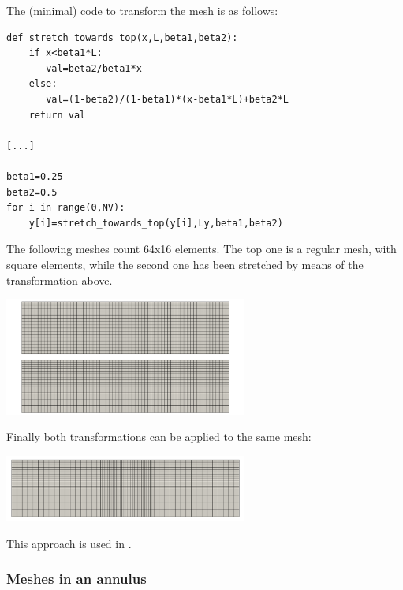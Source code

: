 The (minimal) code to transform the mesh is as follows:
\begin{lstlisting}
def stretch_towards_top(x,L,beta1,beta2):
    if x<beta1*L: 
       val=beta2/beta1*x
    else:
       val=(1-beta2)/(1-beta1)*(x-beta1*L)+beta2*L
    return val

[...]

beta1=0.25
beta2=0.5
for i in range(0,NV):
    y[i]=stretch_towards_top(y[i],Ly,beta1,beta2)
\end{lstlisting}


The following meshes count 64x16 elements. The top one is a regular mesh, with square elements, 
while the second one has been stretched by means of the transformation above.
\begin{center}
\includegraphics[width=8cm]{images/meshes/stretching/stretch_y}
\end{center}

Finally both transformations can be applied to the same mesh:
\begin{center}
\includegraphics[width=8cm]{images/meshes/stretching/stretch_xy}
\end{center}

This approach is used in .

\subsubsection{Meshes in an annulus}


